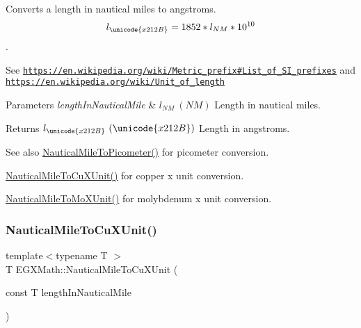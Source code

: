 Converts a length in nautical miles to angstroms. \[ l_{\unicode{x212B}}=1852 * l_{NM} * 10^{10} \]. 

See \href{https://en.wikipedia.org/wiki/Metric_prefix#List_of_SI_prefixes}{\tt https\+://en.\+wikipedia.\+org/wiki/\+Metric\+\_\+prefix\#\+List\+\_\+of\+\_\+\+S\+I\+\_\+prefixes} and \href{https://en.wikipedia.org/wiki/Unit_of_length}{\tt https\+://en.\+wikipedia.\+org/wiki/\+Unit\+\_\+of\+\_\+length} 
\begin{DoxyParams}{Parameters}
{\em length\+In\+Nautical\+Mile} & $ l_{NM}\ (NM)$ Length in nautical miles. \\
\hline
\end{DoxyParams}
\begin{DoxyReturn}{Returns}
$ l_{\unicode{x212B}}\ (\unicode{x212B})$ Length in angstroms. 
\end{DoxyReturn}
\begin{DoxySeeAlso}{See also}
\mbox{\hyperlink{group___e_g_x_math-_conversions-_length_conversions-_nautical-_nautical_mile-_s_i_ga5ab6a92054685d45fb032111bcde94e0}{Nautical\+Mile\+To\+Picometer()}} for picometer conversion. 

\mbox{\hyperlink{group___e_g_x_math-_conversions-_length_conversions-_nautical-_nautical_mile-_non-_s_i_gaa0638917756d520cfc0877dcde60d777}{Nautical\+Mile\+To\+Cu\+X\+Unit()}} for copper x unit conversion. 

\mbox{\hyperlink{group___e_g_x_math-_conversions-_length_conversions-_nautical-_nautical_mile-_non-_s_i_ga17cfe98568d00c2e0b1c0b5d19f1b34e}{Nautical\+Mile\+To\+Mo\+X\+Unit()}} for molybdenum x unit conversion. 
\end{DoxySeeAlso}
\mbox{\label{group___e_g_x_math-_conversions-_length_conversions-_nautical-_nautical_mile-_non-_s_i_gaa0638917756d520cfc0877dcde60d777}} 
\subsubsection{\texorpdfstring{Nautical\+Mile\+To\+Cu\+X\+Unit()}{NauticalMileToCuXUnit()}}
{\footnotesize\ttfamily template$<$typename T $>$ \\
T E\+G\+X\+Math\+::\+Nautical\+Mile\+To\+Cu\+X\+Unit (\begin{DoxyParamCaption}\item[{const T}]{length\+In\+Nautical\+Mile }\end{DoxyParamCaption})}



